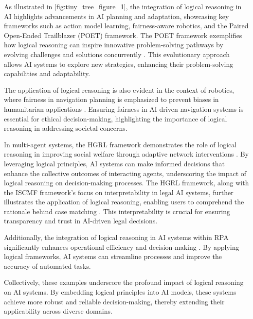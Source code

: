 As illustrated in \autoref{fig:tiny_tree_figure_1}, the integration of logical reasoning in AI highlights advancements in AI planning and adaptation, showcasing key frameworks such as action model learning, fairness-aware robotics, and the Paired Open-Ended Trailblazer (POET) framework. The POET framework exemplifies how logical reasoning can inspire innovative problem-solving pathways by evolving challenges and solutions concurrently \cite{wang2019pairedopenendedtrailblazerpoet}. This evolutionary approach allows AI systems to explore new strategies, enhancing their problem-solving capabilities and adaptability.

The application of logical reasoning is also evident in the context of robotics, where fairness in navigation planning is emphasized to prevent biases in humanitarian applications \cite{brandao2020fairnavigationplanninghumanitarian}. Ensuring fairness in AI-driven navigation systems is essential for ethical decision-making, highlighting the importance of logical reasoning in addressing societal concerns.

In multi-agent systems, the HGRL framework demonstrates the role of logical reasoning in improving social welfare through adaptive network interventions \cite{chen2024adaptivenetworkinterventioncomplex}. By leveraging logical principles, AI systems can make informed decisions that enhance the collective outcomes of interacting agents, underscoring the impact of logical reasoning on decision-making processes. The HGRL framework, along with the ISCMF framework's focus on interpretability in legal AI systems, further illustrates the application of logical reasoning, enabling users to comprehend the rationale behind case matching \cite{lin2023interpretabilityframeworksimilarcase}. This interpretability is crucial for ensuring transparency and trust in AI-driven legal decisions.

Additionally, the integration of logical reasoning in AI systems within RPA significantly enhances operational efficiency and decision-making \cite{pandy2024advancementsroboticsprocessautomation}. By applying logical frameworks, AI systems can streamline processes and improve the accuracy of automated tasks.

Collectively, these examples underscore the profound impact of logical reasoning on AI systems. By embedding logical principles into AI models, these systems achieve more robust and reliable decision-making, thereby extending their applicability across diverse domains.



